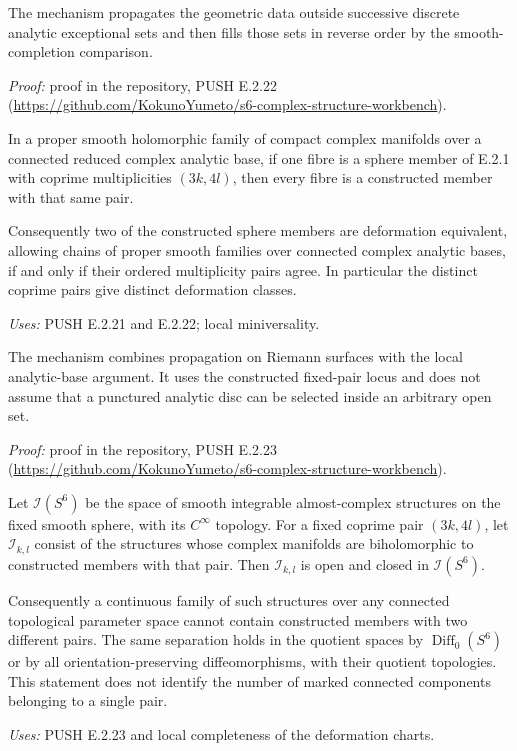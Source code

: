 The mechanism propagates the geometric data outside successive discrete analytic exceptional sets and then fills those sets in reverse order by the smooth-completion comparison.

\noindent\emph{Proof:} proof in the repository, PUSH E.2.22 (\url{https://github.com/KokunoYumeto/s6-complex-structure-workbench}).

\begin{announcement}[PUSH E.2.23; A]\label{push:E.2.23}
In a proper smooth holomorphic family of compact complex
manifolds over a connected reduced complex analytic base,
if one fibre is a sphere member of E.2.1 with coprime
multiplicities $(3k,4l)$, then every fibre is a constructed
member with that same pair.

Consequently two of the constructed sphere members are
deformation equivalent, allowing chains of proper smooth
families over connected complex analytic bases, if and
only if their ordered multiplicity pairs agree.  In
particular the distinct coprime pairs give distinct
deformation classes.
\end{announcement}
\noindent\emph{Uses:} PUSH E.2.21 and E.2.22; local miniversality.\par

The mechanism combines propagation on Riemann surfaces with the local analytic-base argument. It uses the constructed fixed-pair locus and does not assume that a punctured analytic disc can be selected inside an arbitrary open set.

\noindent\emph{Proof:} proof in the repository, PUSH E.2.23 (\url{https://github.com/KokunoYumeto/s6-complex-structure-workbench}).

\begin{announcement}[PUSH E.2.24; A]\label{push:E.2.24}
Let $\mathcal I(S^6)$ be the space of smooth integrable
almost-complex structures on the fixed smooth sphere,
with its $C^\infty$ topology.  For a fixed coprime pair
$(3k,4l)$, let $\mathcal I_{k,l}$ consist of the structures
whose complex manifolds are biholomorphic to constructed
members with that pair.  Then $\mathcal I_{k,l}$ is open
and closed in $\mathcal I(S^6)$.

Consequently a continuous family of such structures
over any connected topological parameter space cannot
contain constructed members with two different pairs.
The same separation holds in the quotient spaces by
$\operatorname{Diff}_0(S^6)$ or by all orientation-preserving
diffeomorphisms, with their quotient topologies.
This statement does not identify the number of marked
connected components belonging to a single pair.
\end{announcement}
\noindent\emph{Uses:} PUSH E.2.23 and local completeness of the deformation charts.\par

